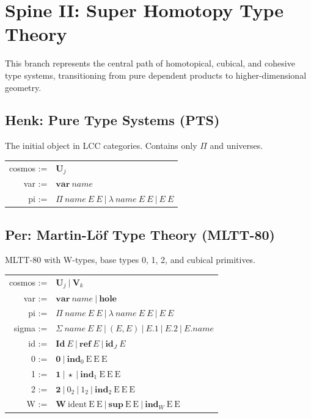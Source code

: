 \documentclass{article}
\theoremstyle{definition}
\theoremstyle{plain}
\begin{document}
\newpage
\section{Spine II: Super Homotopy Type Theory}
This branch represents the central path of homotopical, cubical, and cohesive type systems, transitioning from pure dependent products to higher-dimensional geometry.

\subsection{Henk: Pure Type Systems (PTS)}
The initial object in LCC categories. Contains only $\Pi$ and universes.
\begin{table}[ht!]
\centering
\begin{tabular}{rl}
 cosmos :=&$\textbf{U}_j$ \\
    var :=&$\textbf{var}\ name$ \\
     pi :=&$\Pi\ name\ E\ E\ |\ \lambda\ name\ E\ E\ |\ E\ E$ \\
\end{tabular}
\end{table}

\subsection{Per: Martin-L\"of Type Theory (MLTT-80)}
MLTT-80 with W-types, base types 0, 1, 2, and cubical primitives.
\begin{table}[ht!]
\centering
\begin{tabular}{rl}
 cosmos :=&$\textbf{U}_j \ |\ \textbf{V}_k$ \\
    var :=&$\textbf{var}\ name\ |\ \textbf{hole}$ \\
     pi :=&$\Pi\ name\ E\ E\ |\ \lambda\ name\ E\ E\ |\ E\ E$ \\
  sigma :=&$\Sigma\ name\ E\ E\ |\ (E,E)\ |\ E.1\ |\ E.2\ |\ E.name$ \\
     id :=&$\textbf{Id}\ E\ |\ \textbf{ref}\ E\ |\ \textbf{id$_J$}\ E$ \\
      0 :=&$\textbf{0}\ |\ \textbf{ind$_0$}\ \textrm{E}\ \textrm{E}\ \textrm{E}$ \\
      1 :=&$\textbf{1}\ |\ \star\ |\ \textbf{ind$_1$}\ \textrm{E}\ \textrm{E}\ \textrm{E}$ \\
      2 :=&$\textbf{2}\ |\ 0_2\ |\ 1_2\ |\ \textbf{ind$_2$}\ \textrm{E}\ \textrm{E}\ \textrm{E}$ \\
      W :=&$\textbf{W}\ \textrm{ident}\ \textrm{E}\ \textrm{E}\ |\ \textbf{sup}\ \textrm{E}\ \textrm{E}\ |\ \textbf{ind$_W$}\ \textrm{E}\ \textrm{E}$ \\
\end{tabular}
\end{table}
\end{document}
